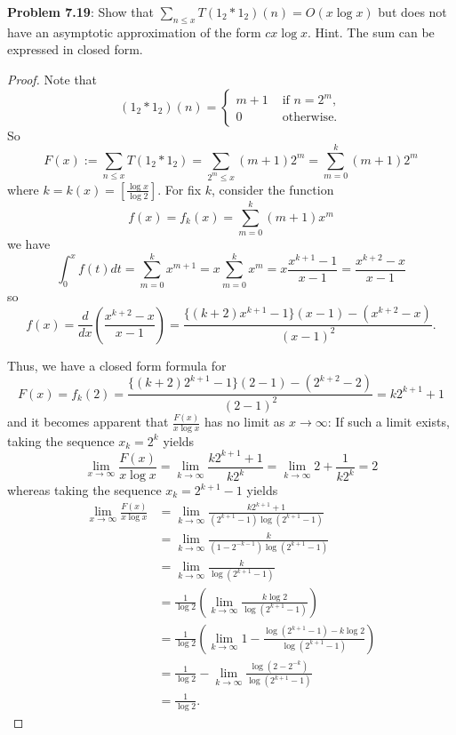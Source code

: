 \documentclass[12pt]{article}
\begin{document}
\fi

\textbf{Problem 7.19}: Show that $\sum_{n \leq x} T(1_2 * 1_2)(n) = O(x \log x)$ but does not have an asymptotic approximation of the form $c x \log x$. Hint. The sum can be expressed in closed form.

\begin{proof}
Note that
$$(1_2 * 1_2)(n) = \begin{cases}
m + 1 &\text{ if } n = 2^m,\\
0 &\text{ otherwise}.
\end{cases}$$
So
$$F(x) := \sum_{n \leq x} T(1_2 * 1_2) = \sum_{2^m \leq x} (m + 1) 2^m = \sum_{m = 0}^{k} (m + 1) 2^m$$
where $k = k(x) = [\frac{\log x}{\log 2}]$. For fix $k$, consider the function
$$f(x) = f_k(x) = \sum_{m = 0}^{k} (m + 1) x^m$$
we have
$$\int_0^x f(t) dt = \sum_{m = 0}^{k} x^{m+1} = x \sum_{m = 0}^{k} x^{m} = x \frac{x^{k+1} - 1}{x - 1} = \frac{x^{k+2} - x}{x - 1}$$
so
$$f(x) = \frac{d}{dx} \left(\frac{x^{k+2} - x}{x - 1}\right) = \frac{\{(k+2) x^{k+1} - 1\}(x - 1) - (x^{k+2} - x)}{(x - 1)^2}.$$

Thus, we have a closed form formula for
$$F(x) = f_k(2) = \frac{\{(k+2) 2^{k+1} - 1\}(2 - 1) - (2^{k+2} - 2)}{(2 - 1)^2} = k 2^{k+1} + 1$$
and it becomes apparent that $\frac{F(x)}{x \log x}$ has no limit as $x \rightarrow \infty$: If such a limit exists, taking the sequence $x_k = 2^k$ yields
$$\lim_{x \rightarrow \infty} \frac{F(x)}{x \log x} = \lim_{k \rightarrow \infty} \frac{k 2^{k+1} + 1}{k 2^k} = \lim_{k \rightarrow \infty} 2 + \frac{1}{k 2^k} = 2$$
whereas taking the sequence $x_k = 2^{k+1} - 1$ yields
\begin{align*}
\lim_{x \rightarrow \infty} \frac{F(x)}{x \log x} &= \lim_{k \rightarrow \infty} \frac{k 2^{k+1} + 1}{(2^{k+1} - 1) \log(2^{k+1} - 1)} \\
&= \lim_{k \rightarrow \infty} \frac{k}{(1 - 2^{-k-1}) \log(2^{k+1} - 1)} \\
&= \lim_{k \rightarrow \infty} \frac{k}{\log(2^{k+1} - 1)} \\
&= \frac{1}{\log 2} \left( \lim_{k \rightarrow \infty} \frac{k \log 2}{\log(2^{k+1} - 1)} \right)\\
&= \frac{1}{\log 2} \left( \lim_{k \rightarrow \infty} 1 - \frac{\log(2^{k+1} - 1) - k \log 2}{\log(2^{k+1} - 1)} \right) \\
&= \frac{1}{\log 2} - \lim_{k \rightarrow \infty} \frac{\log(2 - 2^{-k})}{\log(2^{k+1} - 1)} \\
&= \frac{1}{\log 2}.
\end{align*}
\end{proof}
\end{document}
